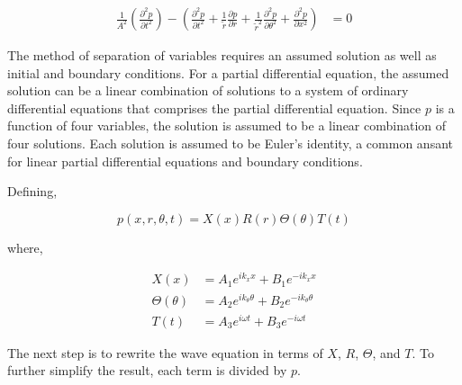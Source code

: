 
\begin{align*} 
    \frac{1}{A^2}\left(
        \frac{\partial^2 {p}}{\partial t^2}
    \right) - 
        \left(
            \frac{\partial^2 {p}}{\partial t^2} + 
            \frac{1}{\tilde{r}}\frac{\partial p}{\partial r} +
            \frac{1}{\tilde{r}^2} \frac{\partial^2 p}{\partial \theta^2} + 
            \frac{\partial^2 p}{\partial x^2} 
        \right) &= 0  
\end{align*} 

 The method of separation of variables requires an assumed solution as well as initial and boundary 
conditions. For a partial differential equation, the assumed solution can be a 
linear combination of solutions to a system of ordinary differential equations that
comprises the partial differential equation. Since $p$ is a function of four
variables, the solution is assumed to be a linear combination of four solutions.
Each solution is assumed to be Euler's identity, a common ansant for linear partial 
differential equations and boundary conditions.

 Defining,

\begin{equation}
    p(x,r,\theta,t) = X(x) R(r) \Theta(\theta) T(t)
\end{equation}

where, 

\begin{align*}
    X(x) &=
    A_1 e^{ik_x x} +
    B_1 e^{-ik_x x }\\
    \Theta(\theta) &=
    A_2 e^{i k_{\theta} \theta } +
    B_2 e^{-ik_{\theta} \theta }\\
    T(t) &=
    A_3 e^{i \omega t } +
    B_3 e^{-i\omega t  }
\end{align*}

The next step is to rewrite the wave equation in terms of $X$, $R$, $\Theta$,
and $T$. To further simplify the result, each term is divided by $p$.


